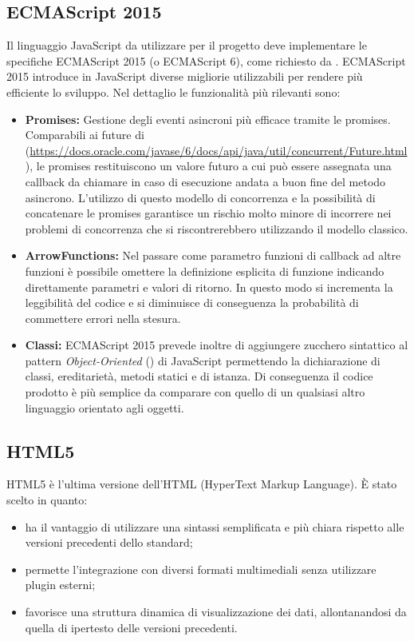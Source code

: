 \subsection{ECMAScript 2015}
Il linguaggio JavaScript da utilizzare per il progetto deve implementare le specifiche ECMAScript 2015 (o ECMAScript 6), come richiesto da \glossario{\Proponente}. ECMAScript 2015 introduce in JavaScript diverse migliorie utilizzabili per rendere più efficiente lo sviluppo. Nel dettaglio le funzionalità più rilevanti sono:
\begin{itemize}
	\item \textbf{Promises:} Gestione degli eventi asincroni più efficace tramite le promises. Comparabili ai future di  (\url{https://docs.oracle.com/javase/6/docs/api/java/util/concurrent/Future.html}), le promises restituiscono un valore futuro a cui può essere assegnata una callback da chiamare in caso di esecuzione andata a buon fine del metodo asincrono. L'utilizzo di questo modello di concorrenza e la possibilità di concatenare le promises garantisce un rischio molto minore di incorrere nei problemi di concorrenza che si riscontrerebbero utilizzando il modello classico.
	\item \textbf{ArrowFunctions:} Nel passare come parametro funzioni di callback ad altre funzioni è possibile omettere la definizione esplicita di funzione indicando direttamente parametri e valori di ritorno. In questo modo si incrementa la leggibilità del codice e si diminuisce di conseguenza la probabilità di commettere errori nella stesura.
	\item \textbf{Classi:} ECMAScript 2015 prevede inoltre di aggiungere zucchero sintattico al pattern \textit{Object-Oriented} () di JavaScript permettendo la dichiarazione di classi, ereditarietà, metodi statici e di istanza. Di conseguenza il codice prodotto è più semplice da comparare con quello di un qualsiasi altro linguaggio orientato agli oggetti.
\end{itemize}

\subsection{HTML5}
HTML5 è l'ultima versione dell'HTML (HyperText Markup Language). È stato scelto in quanto:
\begin{itemize}
	\item ha il vantaggio di utilizzare una sintassi semplificata e più chiara rispetto alle versioni precedenti dello standard;
	\item permette l'integrazione con diversi formati multimediali senza utilizzare plugin esterni; 
	\item favorisce una struttura dinamica di visualizzazione dei dati, allontanandosi da quella di ipertesto delle versioni precedenti.
\end{itemize}

